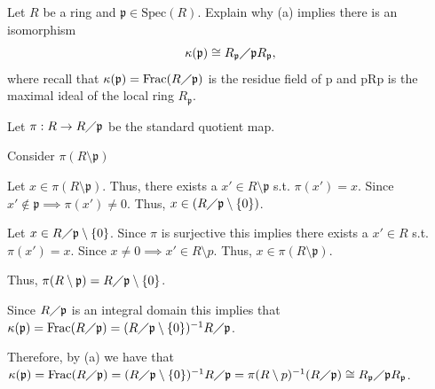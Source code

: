 \documentclass[12pt, letterpaper]{article}
\newcommand{\p}{\mathfrak{p}}
\renewcommand{\t}[1]{\text{#1}}
\newcommand{\Spec}{\mathrm{Spec}}
\begin{document}
\begin{subproblem}{}
    Let $R$ be a ring and $\p \in \Spec(R)$. Explain why (a) implies there is an isomorphism
\[\kappa(\p) \cong R_\p\diagup \p R_\p,\]
where recall that $\kappa(\p) = \t{Frac}(R\diagup \p)$ is the residue field of p and pRp is the maximal
ideal of the local ring $R_\p$.
\end{subproblem}
\begin{problemproof}
    Let $\pi: R \to R\diagup \p$ be the standard quotient map.

    Consider $\pi(R \setminus \p)$

    Let $x \in \pi(R \setminus \p)$. Thus, there exists a $x' \in R \setminus \p$ s.t. $\pi(x')=x$. Since $x' \notin \p \implies \pi(x')\neq 0$. Thus, $x \in (R \diagup \p \setminus \{0\})$.

    Let $x \in R \diagup \p \setminus \{0\}$. Since $\pi$ is surjective this implies there exists a $x' \in R$ s.t. $\pi(x')=x$. Since $x \neq 0 \implies x' \in R \setminus p$. Thus, $x \in \pi(R \setminus \p)$.

    Thus, $\pi(R \setminus \p)=R \diagup \p \setminus \{0\}$.
    
    Since $R \diagup \p$ is an integral domain this implies that $\kappa(\p)=\t{Frac}(R \diagup \p)=(R \diagup \p \setminus \{0\})^{-1} R\diagup \p$.

    Therefore, by (a) we have that $\kappa(\p)=\t{Frac}(R \diagup \p)=(R \diagup \p \setminus \{0\})^{-1} R\diagup \p = \pi(R \setminus p)^{-1}(R \diagup \p) \cong R_\p \diagup \p R_\p$.

    
\end{problemproof}
\end{document}
